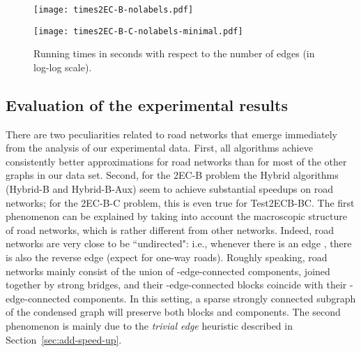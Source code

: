 \documentclass[11pt]{article}
\begin{document}
\begin{figure}[!ht]
\centering
\texttt{[image: times2EC-B-nolabels.pdf]}

\vspace*{0.1in}

\texttt{[image: times2EC-B-C-nolabels-minimal.pdf]}\caption{Running times in seconds with respect to the number of edges (in log-log scale).
}\label{fig:2ecb-running-time}
\end{figure}


\subsection{Evaluation of the experimental results}
\label{sec:discussion}
There are two peculiarities related to road networks that emerge immediately from the analysis of our experimental data.
First, all algorithms achieve consistently better approximations for road networks than for most of the other graphs in our data set.
Second, for the \textsf{2EC-B} problem the \textsf{Hybrid} algorithms (\textsf{Hybrid-B} and \textsf{Hybrid-B-Aux}) seem to achieve substantial speedups on road networks; for the
\textsf{2EC-B-C} problem, this is even true for
\textsf{Test2ECB-BC}.
The first phenomenon can be explained by taking into account the macroscopic structure of road networks, which is rather different from other networks.
Indeed, road networks are very close to be ``undirected": i.e., whenever there is an edge , there is also the reverse edge  (expect for one-way roads).
Roughly speaking, road networks mainly consist of the union of -edge-connected components,  joined together by strong bridges, and their -edge-connected blocks coincide with their -edge-connected components.
In this setting, a sparse strongly connected subgraph of the condensed graph will preserve both blocks and components.
The second phenomenon is mainly due to the \emph{trivial edge} heuristic described in Section~\ref{sec:add-speed-up}.
\end{document}
